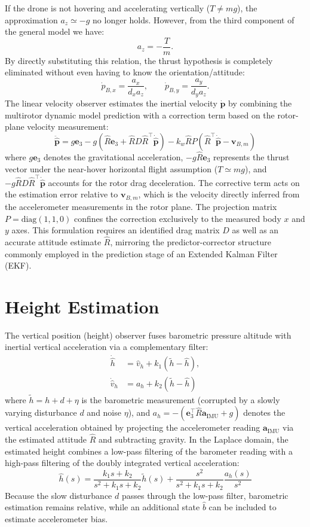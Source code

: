 \documentclass[10pt, a4paper]{report}
\begin{document}
If the drone is not hovering and accelerating vertically ($T \neq mg$), the approximation $a_z \simeq -g$ no longer holds. However, from the third component of the general model we have:
$$a_z = -\frac{T}{m}.$$ By directly substituting this relation, the thrust hypothesis is completely eliminated without even having to know the orientation/attitude:
$$ \dot p_{B,x} = \frac{a_x}{d_x a_z}, \qquad  \dot p_{B,y} = \frac{a_y}{d_y a_z}.$$
The linear velocity observer estimates the inertial velocity $\dot{\mathbf p}$ by combining the multirotor dynamic model prediction with a correction term based on the rotor-plane velocity measurement:
\begin{equation}
\ddot{\hat{\mathbf p}} = g \mathbf e_3 - g \left(\hat R \mathbf e_3 + \hat R D \hat R^\top \dot{\hat{\mathbf p}}\right) - k_w \hat R P \left(\hat R^\top \dot{\hat{\mathbf p}} - \mathbf v_{B,m}\right)
\end{equation}
where $g \mathbf e_3$ denotes the gravitational acceleration, $-g \hat R \mathbf e_3$ represents the thrust vector under the near-hover horizontal flight assumption ($T \simeq mg$), and $-g \hat R D \hat R^\top \dot{\hat{\mathbf p}}$ accounts for the rotor drag deceleration. The corrective term acts on the estimation error relative to $\mathbf v_{B,m}$, which is the velocity directly inferred from the accelerometer measurements in the rotor plane. The projection matrix $P = \text{diag}(1, 1, 0)$ confines the correction exclusively to the measured body $x$ and $y$ axes. This formulation requires an identified drag matrix $D$ as well as an accurate attitude estimate $\hat R$, mirroring the predictor-corrector structure commonly employed in the prediction stage of an Extended Kalman Filter (EKF).
\section{Height Estimation}
The vertical position (height) observer fuses barometric pressure altitude with inertial vertical acceleration via a complementary filter:
\begin{align}
\dot{\hat h} &= \hat v_h + k_1 (\tilde h - \hat h), \\
\dot{\hat v}_h &= a_h + k_2 (\tilde h - \hat h)
\end{align}
where $\tilde h = h + d + \eta$ is the barometric measurement (corrupted by a slowly varying disturbance $d$ and noise $\eta$), and $a_h = -\left(\mathbf e_3^\top \hat R \mathbf a_{\text{IMU}} + g\right)$ denotes the vertical acceleration obtained by projecting the accelerometer reading $\mathbf a_{\text{IMU}}$ via the estimated attitude $\hat R$ and subtracting gravity. In the Laplace domain, the estimated height combines a low-pass filtering of the barometer reading with a high-pass filtering of the doubly integrated vertical acceleration:
\begin{equation}
\hat h(s) = \frac{k_1 s + k_2}{s^2 + k_1 s + k_2} \tilde h(s) + \frac{s^2}{s^2 + k_1 s + k_2} \frac{a_h(s)}{s^2}
\end{equation}
Because the slow disturbance $d$ passes through the low-pass filter, barometric estimation remains relative, while an additional state $\hat b$ can be included to estimate accelerometer bias.
\end{document}
